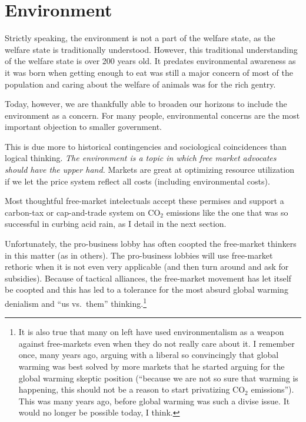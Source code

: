 \chapter{Environment}
\label{chpt:environment}

Strictly speaking, the environment is not a part of the welfare state, as the
welfare state is traditionally understood. However, this traditional
understanding of the welfare state is over 200 years old. It predates
environmental awareness as it was born when getting enough to eat was still a
major concern of most of the population and caring about the welfare of animals
was for the rich gentry.

Today, however, we are thankfully able to broaden our horizons to include the
environment as a concern. For many people, environmental concerns are the most
important objection to smaller government.

This is due more to historical contingencies and sociological coincidences than
logical thinking. \emph{The environment is a topic in which free market
advocates should have the upper hand.} Markets are great at optimizing resource
utilization if we let the price system reflect all costs (including
environmental costs).

Most thoughtful free-market intelectuals accept these permises and support a
carbon-tax or cap-and-trade system on CO$_2$ emissions like the one that was so
successful in curbing acid rain, as I detail in the next section.

Unfortunately, the pro-business lobby has often coopted the free-market
thinkers in this matter (as in others). The pro-business lobbies will use
free-market rethoric when it is not even very applicable (and then turn around
and ask for subsidies). Because of tactical alliances, the free-market movement
has let itself be coopted and this has led to a tolerance for the most absurd
global warming denialism and ``us vs.\ them'' thinking.\footnote{It is also
true that many on left have used environmentalism as a weapon against
free-markets even when they do not really care about it. I remember once, many
years ago, arguing with a liberal so convincingly that global warming was best
solved by more markets that he started arguing for the global warming skeptic
position (``because we are not so sure that warming is happening, this should
not be a reason to start privatizing CO${}_2$ emissions''). This was many years
ago, before global warming was such a divise issue. It would no longer be
possible today, I think.}

